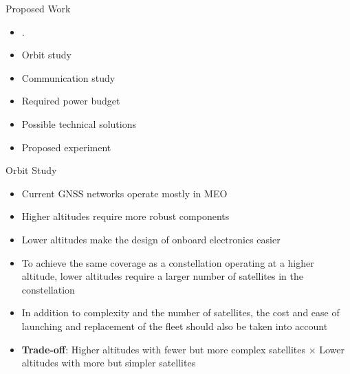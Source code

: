 %
%
%
%
%

%
%
%
%
%

\begin{frame}{Proposed Work}

    \begin{itemize}
        \item .
        \item Orbit study
        \item Communication study
        \item Required power budget
        \item Possible technical solutions
        \item Proposed experiment
    \end{itemize}

\end{frame}

\begin{frame}{Orbit Study}

    \begin{itemize}
        \item Current GNSS networks operate mostly in MEO
        \vspace{0.1cm}
        \item Higher altitudes require more robust components
        \vspace{0.1cm}
        \item Lower altitudes make the design of onboard electronics easier
        \vspace{0.1cm}
        \item To achieve the same coverage as a constellation operating at a higher altitude, lower altitudes require a larger number of satellites in the constellation
        \vspace{0.1cm}
        \item In addition to complexity and the number of satellites, the cost and ease of launching and replacement of the fleet should also be taken into account
        \vspace{0.1cm}
        \item \textbf{Trade-off}: Higher altitudes with fewer but more complex satellites $\times$ Lower altitudes with more but simpler satellites
    \end{itemize}

\end{frame}

